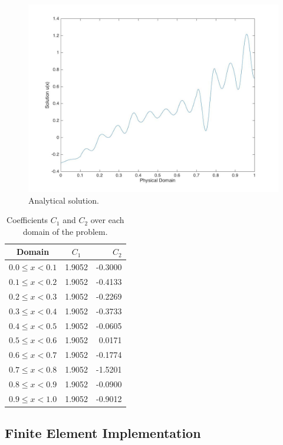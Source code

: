 \documentclass[10pt]{article}
\begin{document}
\begin{figure}[H]
\begin{center}  \includegraphics[width=0.75\linewidth]{AnalyticalSoln2.jpg}
\caption{Analytical solution.}
\end{center}
\end{figure}

\begin{table}[H]
\caption{Coefficients \(C_1\) and \(C_2\) over each domain of the problem.}
\centering
\begin{tabular}{c c r}
\hline\hline
Domain & \(C_1\) & \(C_2\)\\ [0.5ex]
\hline
\(0.0\leq x< 0.1\) & 1.9052  & -0.3000\\
\(0.1\leq x< 0.2\) & 1.9052  & -0.4133\\
\(0.2\leq x< 0.3\) & 1.9052  & -0.2269 \\
\(0.3\leq x< 0.4\) & 1.9052  & -0.3733\\
\(0.4\leq x< 0.5\) & 1.9052  & -0.0605\\
\(0.5\leq x< 0.6\) & 1.9052  &  0.0171\\
\(0.6\leq x< 0.7\) & 1.9052  & -0.1774\\
\(0.7\leq x< 0.8\) & 1.9052  & -1.5201\\
\(0.8\leq x< 0.9\) & 1.9052  & -0.0900\\
\(0.9\leq x< 1.0\) & 1.9052  & -0.9012\\
\hline
\end{tabular}
\label{table:orders}
\end{table}

\subsection{Finite Element Implementation}
\end{document}

